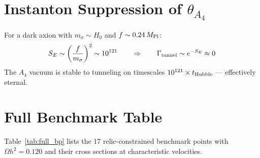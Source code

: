 \documentclass[12pt,a4paper]{article}
\begin{document}
\section{Instanton Suppression of $\theta_{A_4}$}
\label{app:instanton}

For a dark axion with $m_\sigma \sim H_0$ and $f \sim 0.24\,M_{\rm Pl}$:
\begin{equation}
  S_E \sim \left(\frac{f}{m_\sigma}\right)^2 \sim 10^{121}
  \qquad \Rightarrow \qquad
  \Gamma_{\rm tunnel} \sim e^{-S_E} \approx 0
\end{equation}
The $A_4$ vacuum is stable to tunneling on timescales
$10^{121} \times t_{\rm Hubble}$ — effectively eternal.

\section{Full Benchmark Table}
\label{app:benchmarks_full}

Table~\ref{tab:full_bp} lists the 17 relic-constrained benchmark points
with $\Omega h^2 = 0.120$ and their cross sections at characteristic velocities.
\end{document}
